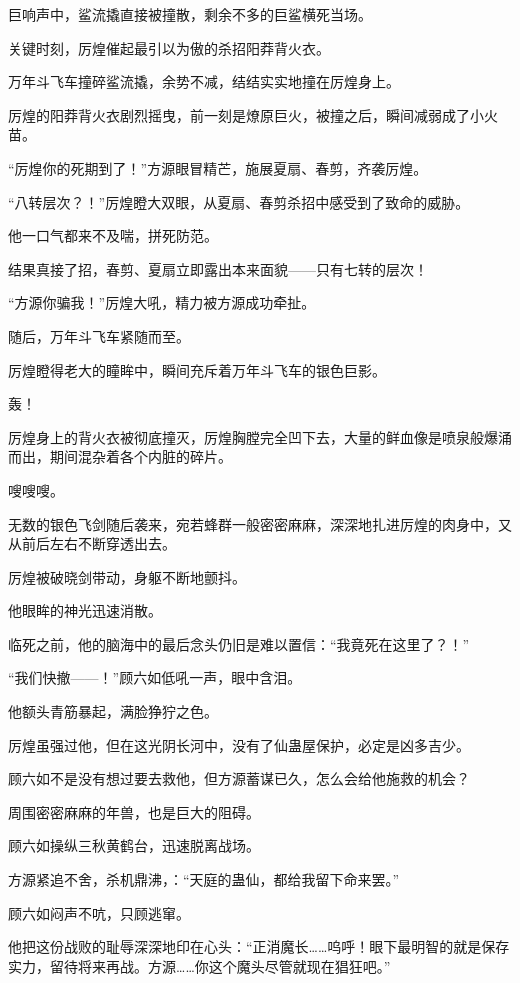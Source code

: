 \begin{this_body}
巨响声中，鲨流撬直接被撞散，剩余不多的巨鲨横死当场。

关键时刻，厉煌催起最引以为傲的杀招阳莽背火衣。

万年斗飞车撞碎鲨流撬，余势不减，结结实实地撞在厉煌身上。

厉煌的阳莽背火衣剧烈摇曳，前一刻是燎原巨火，被撞之后，瞬间减弱成了小火苗。

“厉煌你的死期到了！”方源眼冒精芒，施展夏扇、春剪，齐袭厉煌。

“八转层次？！”厉煌瞪大双眼，从夏扇、春剪杀招中感受到了致命的威胁。

他一口气都来不及喘，拼死防范。

结果真接了招，春剪、夏扇立即露出本来面貌——只有七转的层次！

“方源你骗我！”厉煌大吼，精力被方源成功牵扯。

随后，万年斗飞车紧随而至。

厉煌瞪得老大的瞳眸中，瞬间充斥着万年斗飞车的银色巨影。

轰！

厉煌身上的背火衣被彻底撞灭，厉煌胸膛完全凹下去，大量的鲜血像是喷泉般爆涌而出，期间混杂着各个内脏的碎片。

嗖嗖嗖。

无数的银色飞剑随后袭来，宛若蜂群一般密密麻麻，深深地扎进厉煌的肉身中，又从前后左右不断穿透出去。

厉煌被破晓剑带动，身躯不断地颤抖。

他眼眸的神光迅速消散。

临死之前，他的脑海中的最后念头仍旧是难以置信：“我竟死在这里了？！”

“我们快撤——！”顾六如低吼一声，眼中含泪。

他额头青筋暴起，满脸狰狞之色。

厉煌虽强过他，但在这光阴长河中，没有了仙蛊屋保护，必定是凶多吉少。

顾六如不是没有想过要去救他，但方源蓄谋已久，怎么会给他施救的机会？

周围密密麻麻的年兽，也是巨大的阻碍。

顾六如操纵三秋黄鹤台，迅速脱离战场。

方源紧追不舍，杀机鼎沸，：“天庭的蛊仙，都给我留下命来罢。”

顾六如闷声不吭，只顾逃窜。

他把这份战败的耻辱深深地印在心头：“正消魔长……呜呼！眼下最明智的就是保存实力，留待将来再战。方源……你这个魔头尽管就现在猖狂吧。”

\end{this_body}

